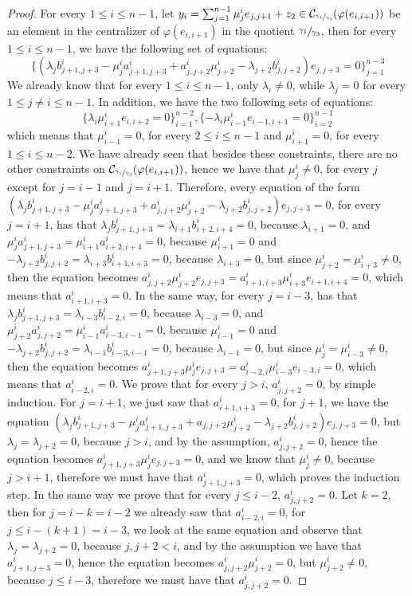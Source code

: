 \documentclass[12pt,fleqn]{article}
\begin{document}
\begin{proof}
For every $1\leq i\leq n-1$, let $y_i=\sum_{j=1}^{n-1}\mu_j^i e_{j,j+1}+z_2\in\mathcal{C}_{\sfrac{\gamma_1}{\gamma_3}}(\varphi(e_{i,i+1}))$ be an element in the centralizer of $\varphi(e_{i,i+1})$ in the quotient $\sfrac{\gamma_1}{\gamma_3}$, then for every $1\leq i\leq n-1$, we have the following set of equations: \[\{(\lambda_{j}b_{j+1,j+3}^i-\mu_{j}^i a_{j+1,j+3}^i+a_{j,j+2}^i\mu_{j+2}^i-\lambda_{j+2}b_{j,j+2}^i)e_{j,j+3}=0\}_{j=1}^{n-3}\]
We already know that for every $1\leq i\leq n-1$, only $\lambda_i\neq 0$, while $\lambda_j=0$ for every $1\leq j\neq i\leq n-1$. In addition, we have the two following sets of equations: \[\{\lambda_i\mu_{i+1}^i e_{i,i+2}=0\}_{i=1}^{n-2},\{-\lambda_i\mu_{i-1}^i e_{i-1,i+1}=0\}_{i=2}^{n-1}\]
which means that $\mu_{i-1}^i=0$, for every $2\leq i\leq n-1$ and $\mu_{i+1}^i=0$, for every $1\leq i\leq n-2$. We have already seen that besides these constraints, there are no other constraints on $\mathcal{C}_{\sfrac{\gamma_1}{\gamma_3}}(\varphi(e_{i,i+1}))$, hence we have that $\mu_j^i\neq 0$, for every $j$ except for $j=i-1$ and $j=i+1$. Therefore, every equation of the form $(\lambda_{j}b_{j+1,j+3}^i-\mu_{j}^i a_{j+1,j+3}^i+a_{j,j+2}^i\mu_{j+2}^i-\lambda_{j+2}b_{j,j+2}^i)e_{j,j+3}=0$, for every $j=i+1$, has that $\lambda_j b_{j+1,j+3}^i=\lambda_{i+1}b_{i+2,i+4}^i=0$, because $\lambda_{i+1}=0$, and $\mu_j^i a_{j+1,j+3}^i=\mu_{i+1}^i a_{i+2,i+4}^i=0$, because $\mu_{i+1}^i=0$ and $-\lambda_{j+2}b_{j,j+2}^i=\lambda_{i+3}b_{i+1,i+3}^i=0$, because $\lambda_{i+3}=0$, but since $\mu_{j+2}^i=\mu_{i+3}^i\neq 0$, then the equation becomes $a_{j,j+2}^i\mu_{j+2}^i e_{j,j+3}=a_{i+1,i+3}^i\mu_{i+3}^i e_{i+1,i+4}=0$, which means that $a_{i+1,i+3}^i=0$. In the same way, for every $j=i-3$, has that $\lambda_j b_{j+1,j+3}^i=\lambda_{i-3}b_{i-2,i}^i=0$, because $\lambda_{i-3}=0$, and $\mu_{j+2}^i a_{j,j+2}^i=\mu_{i-1}^i a_{i-3,i-1}^i=0$, because $\mu_{i-1}^i=0$ and $-\lambda_{j+2}b_{j,j+2}^i=\lambda_{i-1}b_{i-3,i-1}^i=0$, because $\lambda_{i-1}=0$, but since $\mu_j^i=\mu_{i-3}^i\neq 0$, then the equation becomes $a_{j+1,j+3}^i\mu_j^i e_{j,j+3}=a_{i-2,i}^i\mu_{i-3}^i e_{i-3,i}=0$, which means that $a_{i-2,i}^i=0$. We prove that for every $j>i$, $a_{j,j+2}^i=0$, by simple induction. For $j=i+1$, we just saw that $a_{i+1,i+3}^i=0$, for $j+1$, we have the equation $(\lambda_j b_{j+1,j+3}^i-\mu_j^i a_{j+1,j+3}^i+a_{j,j+2}\mu_{j+2}^i-\lambda_{j+2}b_{j,j+2}^i)e_{j,j+3}=0$, but $\lambda_j=\lambda_{j+2}=0$, because $j>i$, and by the assumption, $a_{j,j+2}^i=0$, hence the equation becomes $a_{j+1,j+3}^i\mu_j^i e_{j,j+3}=0$, and we know that $\mu_j^i\neq 0$, because $j>i+1$, therefore we must have that $a_{j+1,j+3}^i=0$, which proves the induction step. In the same way we prove that for every $j\leq i-2$, $a_{j,j+2}^i=0$. Let $k=2$, then for $j=i-k=i-2$ we already saw that $a_{i-2,i}^i=0$, for $j\leq i-(k+1)=i-3$, we look at the same equation and observe that $\lambda_j=\lambda_{j+2}=0$, because $j,j+2<i$, and by the assumption we have that $a_{j+1,j+3}^i=0$, hence the equation becomes $a_{j,j+2}^i\mu_{j+2}^i=0$, but $\mu_{j+2}^i\neq 0$, because $j\leq i-3$, therefore we must have that $a_{j,j+2}^i=0$.
\end{proof}
\end{document}

